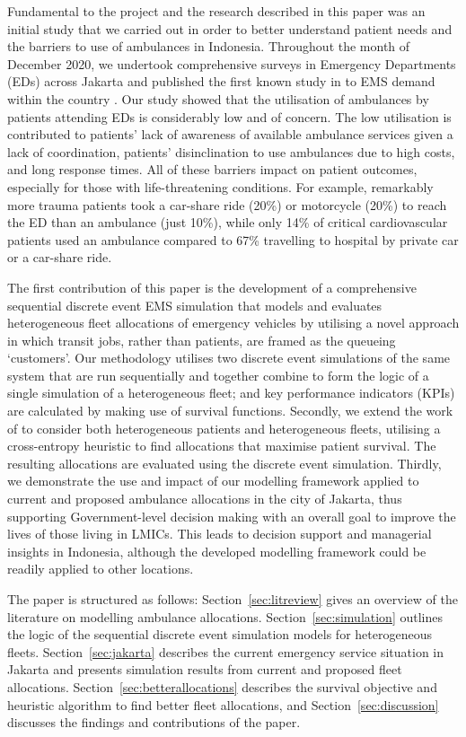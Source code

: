 \documentclass[preprint,12pt]{elsarticle}
\begin{document}
Fundamental to the project and the research described in this paper was an initial study that we carried out in order to better understand patient needs and the barriers to use of ambulances in Indonesia. Throughout the month of December 2020, we undertook comprehensive surveys in Emergency Departments (EDs) across Jakarta and published the first known study in to EMS demand within the country \cite{BriceSyaribahNoor2022Esui}. Our study showed that the utilisation of ambulances by patients attending EDs is considerably low and of concern. The low utilisation is contributed to patients’ lack of awareness of available ambulance services given a lack of coordination, patients’ disinclination to use ambulances due to high costs, and long response times.  All of these barriers impact on patient outcomes, especially for those with  life-threatening conditions. For example, remarkably more trauma patients took a car-share ride (20\%) or motorcycle (20\%) to reach the ED than an ambulance (just 10\%), while only 14\% of critical cardiovascular patients used an ambulance compared to 67\% travelling to hospital by private car or a car-share ride.

The first contribution of this paper is the development of a comprehensive sequential discrete event EMS simulation that models and evaluates heterogeneous fleet allocations of emergency vehicles by utilising a novel approach in which transit jobs, rather than patients, are framed as the queueing `customers'. Our methodology utilises two discrete event simulations of the same system that are run sequentially and together combine to form the logic of a single simulation of a heterogeneous fleet; and key performance indicators (KPIs) are calculated by making use of survival functions. Secondly, we extend the work of \cite{Knight2012918} to consider both heterogeneous patients and heterogeneous fleets, utilising a cross-entropy heuristic to find allocations that maximise patient survival. The resulting allocations are evaluated using the discrete event simulation. Thirdly, we demonstrate the use and impact of our modelling framework applied to current and proposed ambulance allocations in the city of Jakarta, thus supporting Government-level decision making with an overall goal to improve the lives of those living in LMICs.
This leads to decision support and managerial insights in Indonesia, although the developed modelling framework could be readily applied to other locations.

The paper is structured as follows: Section~\ref{sec:litreview} gives an overview of the literature on modelling ambulance allocations. Section~\ref{sec:simulation} outlines the logic of the sequential discrete event simulation models for heterogeneous fleets. Section~\ref{sec:jakarta} describes the current emergency service situation in Jakarta and presents simulation results from current and proposed fleet allocations. Section~\ref{sec:betterallocations} describes the survival objective and heuristic algorithm to find better fleet allocations, and Section~\ref{sec:discussion} discusses the findings and contributions of the paper.
\end{document}
